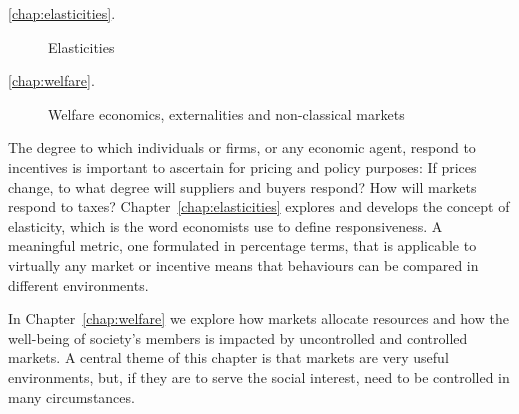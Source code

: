 
{\large\color{parttextcolour}
\begin{description}
\item[\textmd{\ref{chap:elasticities}.}] Elasticities

\item[\textmd{\ref{chap:welfare}.}] Welfare economics, externalities and non-classical markets
\end{description}
}

\vspace{1cm}

The degree to which individuals or firms, or any economic agent, respond to incentives is important to ascertain for pricing and policy purposes: If prices change, to what degree will suppliers and buyers respond? How will markets respond to taxes? Chapter~\ref{chap:elasticities} explores and develops the concept of elasticity, which is the word economists use to define responsiveness. A meaningful metric, one formulated in percentage terms, that is applicable to virtually any market or incentive means that behaviours can be compared in different environments. 

In Chapter~\ref{chap:welfare} we explore how markets allocate resources and how the well-being of society's members is impacted by uncontrolled and controlled markets. A central theme of this chapter is that markets are very useful environments, but, if they are to serve the social interest, need to be controlled in many circumstances.

